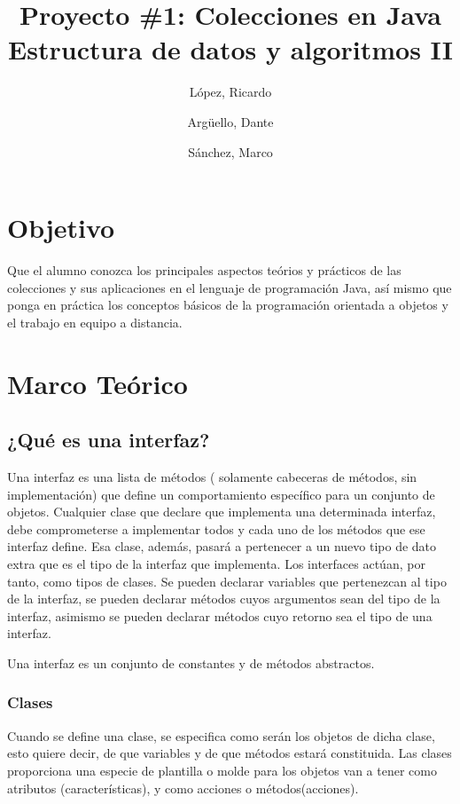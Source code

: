 \documentclass[11pt]{article}
\title{Proyecto \#1: Colecciones en Java\\
Estructura de datos y algoritmos II}
\author{López, Ricardo
\and Argüello, Dante
\and Sánchez, Marco}
\begin{document}
\maketitle{}

\section{Objetivo}
\par

Que el alumno conozca los principales aspectos teórios y prácticos de
las colecciones y sus aplicaciones en el lenguaje de programación Java,
así mismo que ponga en práctica los conceptos básicos de la programación
orientada a objetos y el trabajo en equipo a distancia.

\section{Marco Teórico}
\subsection{¿Qué es una interfaz?}

\par
Una interfaz es una lista de métodos ( solamente cabeceras de 
métodos, sin implementación) que define un comportamiento específico 
para un conjunto de objetos. Cualquier clase que declare que 
implementa una determinada interfaz, debe comprometerse a 
implementar todos y cada uno de los métodos que ese interfaz define. 
Esa clase, además, pasará a pertenecer a un nuevo tipo de dato extra 
que es el tipo de la interfaz que implementa. Los interfaces actúan, 
por tanto, como tipos de clases. Se pueden declarar variables que 
pertenezcan al tipo de la interfaz, se pueden declarar métodos cuyos 
argumentos sean del tipo de la interfaz, asimismo se pueden declarar 
métodos cuyo retorno sea el tipo de una interfaz.

\par
Una interfaz es un conjunto de constantes y de métodos abstractos.

\subsubsection{Clases}

\par
Cuando se define una clase, se especifica como serán los objetos de 
dicha clase, esto quiere decir, de que variables y de que métodos 
estará constituida. Las clases proporciona una especie de plantilla o 
molde para los objetos van a tener como atributos (características), 
y como acciones o métodos(acciones).
\end{document}
